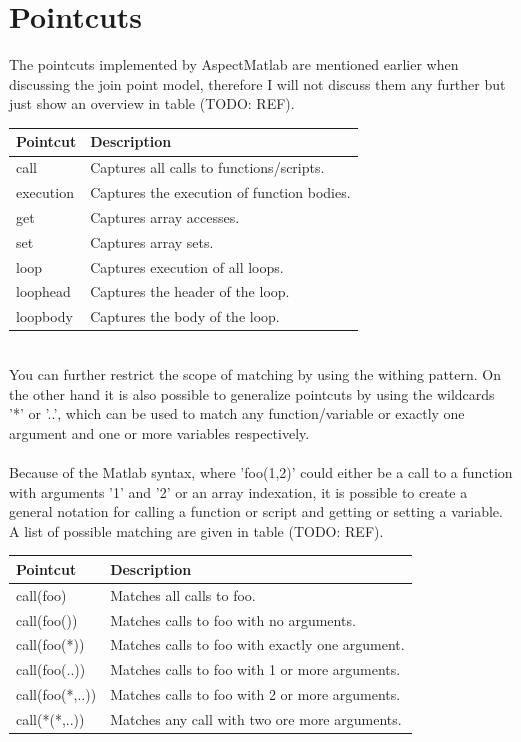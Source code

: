 \documentclass[a4paper]{report}
\begin{document}
\section{Pointcuts}
The pointcuts implemented by AspectMatlab are mentioned earlier when discussing the join point model, therefore I will not discuss them any further but just show an overview in table (TODO: REF).\\
\begin{table}
\centering
\begin{tabular}{l|l}
\hline
Pointcut & Description\\
\hline
\hline
call & Captures all calls to functions/scripts.\\
execution & Captures the execution of function bodies.\\
get & Captures array accesses.\\
set & Captures array sets.\\
loop & Captures execution of all loops.\\
loophead & Captures the header of the loop.\\
loopbody & Captures the body of the loop.\\
\hline
\end{tabular}
\end{table}\\
You can further restrict the scope of matching by using the withing pattern. On the other hand it is also possible to generalize pointcuts by using the wildcards '*' or '..', which can be used to match any function/variable or exactly one argument and one or more variables respectively.\\
\\
Because of the Matlab syntax, where 'foo(1,2)' could either be a call to a function with arguments '1' and '2' or an array indexation, it is possible to create a general notation for calling a function or script and getting or setting a variable. A list of possible matching are given in table (TODO: REF).\\
\begin{table}
\centering
\begin{tabular}{l|l}
\hline
Pointcut & Description\\
\hline
\hline
call(foo) & Matches all calls to foo.\\
call(foo()) & Matches calls to foo with no arguments.\\
call(foo(*)) & Matches calls to foo with exactly one argument.\\
call(foo(..)) & Matches calls to foo with 1 or more arguments.\\
call(foo(*,..)) & Matches calls to foo with 2 or more arguments.\\
call(*(*,..)) & Matches any call with two ore more arguments.\\
\hline
\end{tabular}
\end{table}\\
\end{document}
